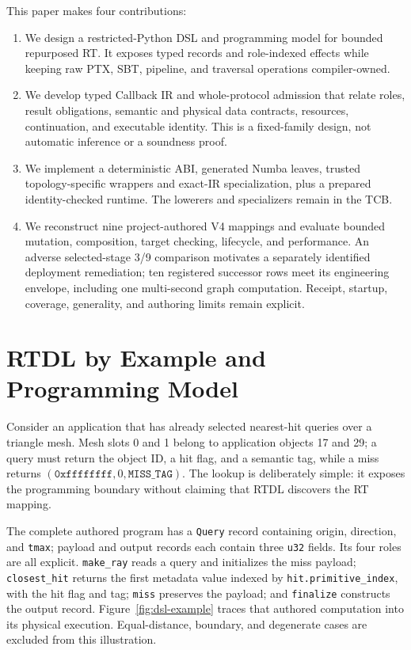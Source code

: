 \documentclass[sigplan,screen,review,anonymous]{acmart}
\newcommand{\rtdl}{\textsc{RTDL}\xspace}
\begin{document}
This paper makes four contributions:
\begin{enumerate}[leftmargin=*,itemsep=1pt,topsep=2pt]
  \item We design a restricted-Python DSL and programming model for bounded
  repurposed RT. It exposes typed records and role-indexed effects while keeping
  raw PTX, SBT, pipeline, and traversal operations compiler-owned.
  \item We develop typed Callback IR and whole-protocol admission that relate
  roles, result obligations, semantic and physical data contracts, resources,
  continuation, and executable identity. This is a fixed-family design, not
  automatic inference or a soundness proof.
  \item We implement a deterministic ABI, generated Numba leaves, trusted
  topology-specific wrappers and exact-IR specialization, plus a prepared
  identity-checked runtime. The lowerers and specializers remain in the TCB.
  \item We reconstruct nine project-authored V4 mappings and evaluate bounded
  mutation, composition, target checking, lifecycle, and performance. An
  adverse selected-stage 3/9 comparison motivates a separately identified
  deployment remediation; ten registered successor rows meet its engineering
  envelope, including one multi-second graph computation. Receipt, startup,
  coverage, generality, and authoring limits remain explicit.
\end{enumerate}

\section{RTDL by Example and Programming Model}

Consider an application that has already selected nearest-hit queries over a
triangle mesh. Mesh slots 0 and 1 belong to application objects 17 and 29; a
query must return the object ID, a hit flag, and a semantic tag, while a miss
returns $(\mathtt{0xffffffff},0,\mathtt{MISS\_TAG})$. The lookup is deliberately
simple: it exposes the programming boundary without claiming that \rtdl
discovers the RT mapping.

The complete authored program has a \texttt{Query} record containing origin,
direction, and \texttt{tmax}; payload and output records each contain three
\texttt{u32} fields. Its four roles are all explicit. \texttt{make\_ray} reads a
query and initializes the miss payload; \texttt{closest\_hit} returns the first
metadata value indexed by \texttt{hit.primitive\_index}, with the hit flag and tag;
\texttt{miss} preserves the payload; and \texttt{finalize} constructs the output
record. Figure~\ref{fig:dsl-example} traces that authored computation into its
physical execution. Equal-distance, boundary, and degenerate cases are excluded
from this illustration.
\end{document}
